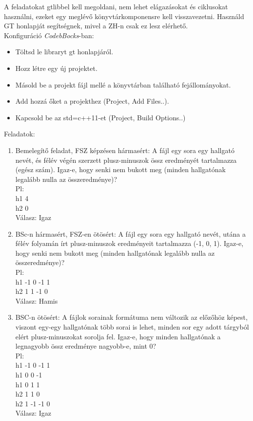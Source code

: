 \documentclass[12pt,a4paper]{article}
\begin{document}
A feladatokat gtlibbel kell megoldani, nem lehet elágazásokat és ciklusokat használni, ezeket egy meglévő könyvtárkomponensre kell visszavezetni. Használd GT honlapját segítségnek, mivel a ZH-n csak ez lesz elérhető. \\

Konfiguráció \textit{CodebBocks}-ban: 
\begin{itemize}
\item Töltsd le libraryt gt honlapjáról.
\item Hozz létre egy új projektet.
\item Másold be a projekt fájl mellé a könyvtárban található fejállományokat.
\item Add hozzá őket a projekthez (Project, Add Files..). 
\item Kapcsold be az std=c++11-et (Project, Build Options..)
\end{itemize}

Feladatok:
\begin{enumerate}
\item Bemelegítő feladat, FSZ képzésen hármasért: A fájl egy sora egy hallgató nevét, és félév végén szerzett plusz-minuszok össz eredményét tartalmazza (egész szám). Igaz-e, hogy senki nem bukott meg (minden hallgatónak legalább nulla az összeredménye)? \\
Pl: \\
h1 4 \\
h2 0 \\
Válasz: Igaz
\item BSc-n hármasért, FSZ-en ötösért: A fájl egy sora egy hallgató nevét, utána a félév folyamán írt plusz-minuszok eredményeit tartalmazza (-1, 0, 1). Igaz-e, hogy senki nem bukott meg (minden hallgatónak legalább nulla az összeredménye)? 
 \\
Pl: \\
h1 -1 0 -1 1 \\
h2 1 1 -1 0  \\
Válasz: Hamis
\item BSC-n ötösért: A fájlok sorainak formátuma nem változik az előzőhöz képest, viszont egy-egy hallgatónak több sorai is lehet, minden sor egy adott tárgyból elért plusz-minuszokat sorolja fel. Igaz-e, hogy  minden hallgatónak a legnagyobb össz eredménye nagyobb-e, mint 0? 
 \\
Pl: \\
h1 -1 0 -1 1 \\
h1 0 0 -1 \\
h1 0 1 1 \\
h2 1 1 0 \\
h2 1 -1 -1 0  \\
Válasz: Igaz
\end{enumerate}
\end{document}

